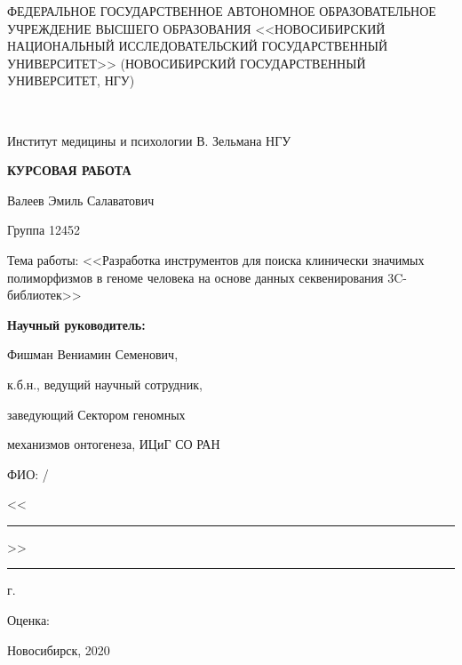\documentclass[a4paper,12pt]{article}
\begin{document}
\begin{titlepage}

\begin{center}
 \begin{small}
ФЕДЕРАЛЬНОЕ ГОСУДАРСТВЕННОЕ АВТОНОМНОЕ ОБРАЗОВАТЕЛЬНОЕ УЧРЕЖДЕНИЕ ВЫСШЕГО ОБРАЗОВАНИЯ <<НОВОСИБИРСКИЙ НАЦИОНАЛЬНЫЙ ИССЛЕДОВАТЕЛЬСКИЙ ГОСУДАРСТВЕННЫЙ УНИВЕРСИТЕТ>> (НОВОСИБИРСКИЙ ГОСУДАРСТВЕННЫЙ УНИВЕРСИТЕТ, НГУ)

~

Институт медицины и психологии В. Зельмана НГУ
\end{small}

\vspace{5cm}

\begin{LARGE}{\textbf{КУРСОВАЯ РАБОТА}}\end{LARGE}

\vspace{0.5cm}

Валеев Эмиль Салаватович

Группа 12452

\vspace{0.5cm}

Тема работы: <<Разработка инструментов для поиска клинически значимых полиморфизмов в геноме человека на основе данных секвенирования 3C-библиотек>>

\end{center}

\vfill

\hfill
\begin{minipage}{0.47\textwidth}

\textbf{Научный руководитель:}

Фишман Вениамин Семенович,

к.б.н., ведущий научный сотрудник,

заведующий Сектором геномных

механизмов онтогенеза, ИЦиГ СО РАН

\vspace{1cm}

ФИО: \hrulefill/\hrulefill

<<\rule{2em}{0.4pt}>>\rule{2em}{0.4pt} г.

\vspace{1cm}

Оценка: \hrulefill

\end{minipage}

\vfill

{\centering \begin{small}Новосибирск, 2020\end{small}\par}

\end{titlepage}
\end{document}
